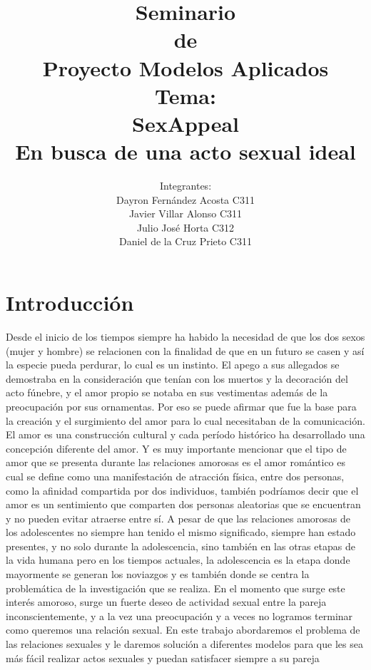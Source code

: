 \documentclass{llncs}
\title{\large\huge Seminario\\ de \\Proyecto Modelos Aplicados\\ \small Tema:\\ \huge SexAppeal\\ \small En busca de una acto sexual ideal}
\author{ Integrantes: \\ Dayron Fernández Acosta C311\\ Javier Villar Alonso C311 \\ Julio José Horta C312\\ Daniel de la Cruz Prieto C311\\ }
\begin{document}
\maketitle
\newpage

\section{Introducción}
Desde el inicio de los tiempos siempre ha habido la necesidad de que los dos sexos (mujer y hombre) se relacionen con la finalidad de que en un futuro se casen y así la especie pueda perdurar, lo cual es un instinto. El apego a sus allegados se demostraba en la consideración que tenían con los muertos y la decoración del acto fúnebre, y el amor propio se notaba en sus vestimentas además de la preocupación por sus ornamentas. Por eso se puede afirmar que fue la base para la creación y el surgimiento del amor para lo cual necesitaban de la comunicación.
\newline
\newline
El amor es una construcción cultural y cada período histórico ha desarrollado una concepción diferente del amor. Y es muy importante mencionar que el tipo de amor que se presenta durante las relaciones amorosas es el amor romántico es cual se define como una manifestación de atracción física, entre dos personas, como la afinidad compartida por dos individuos, también podríamos decir que el amor es un sentimiento que comparten dos personas aleatorias que se encuentran y no pueden evitar atraerse entre sí. A pesar de que las relaciones amorosas de los adolescentes no siempre han tenido el mismo significado, siempre han estado presentes, y no solo durante la adolescencia, sino también en las otras etapas de la vida humana pero en los tiempos actuales, la adolescencia es la etapa donde mayormente se generan los noviazgos y es también donde se centra la problemática de la investigación que se realiza. 
\newline
\newline
En el momento que surge este interés amoroso, surge un fuerte deseo de actividad sexual entre la pareja inconscientemente, y a la vez una preocupación y a veces no logramos terminar como queremos una relación sexual.
\newline
\newline
En este trabajo abordaremos el problema de las relaciones sexuales y le daremos solución a diferentes modelos para que les sea más fácil realizar actos sexuales y puedan satisfacer siempre a su pareja
\end{document}
